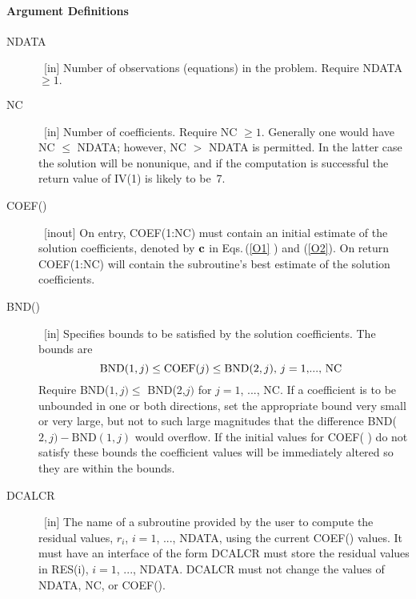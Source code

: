\documentclass[twoside]{MATH77}
\begin{document}
\paragraph{Argument Definitions}
\begin{description}
\item[NDATA]  \ [in] Number of observations (equations) in the problem.
Require NDATA $\geq 1.$

\item[NC]  \ [in] Number of coefficients. Require NC $\geq 1$. Generally one
would have NC $\leq $ NDATA; however, NC $>$ NDATA is permitted. In the
latter case the solution will be nonunique, and if the computation is
successful the return value of IV(1) is likely to be~7.

\item[COEF()]  \ [inout] On entry, COEF(1:NC) must contain an initial
estimate of the solution coefficients, denoted by ${\bf c}$ in Eqs.\,(\ref{O1}%
) and (\ref{O2}). On return COEF(1:NC) will contain the subroutine's best
estimate of the solution coefficients.

\item[BND()]  \ [in] Specifies bounds to be satisfied by the solution
coefficients. The bounds are
\begin{equation*}
\hspace{-5pt}\text{BND}(1,j)\leq \text{COEF}(j)\leq \text{BND}(2,j)
\text{, }j=1\text{,..., NC}
\end{equation*}
Require BND($1,j)\leq $ BND(2,$j)$ for $j=1$, ..., NC. If a coefficient is
to be unbounded in one or both directions, set the appropriate bound very
small or very large, but not to such large magnitudes that the
difference BND($2,j)-\text{BND}(1,j)$ would overflow. If the initial
values for COEF( ) do not satisfy these bounds the coefficient values will
be immediately altered so they are within the bounds.

\item[DCALCR]  \ [in] The name of a subroutine provided by the user to
compute the residual values, $r_i$, $i=1$, ..., NDATA, using the current
COEF() values. It must have an interface of the form
\vspace{-8pt}{\tt \begin{tabbing}
SUBROUTINE DCALCR(NDATA, NC, COEF, ICOUNT,\\
\ \ \ \=RES)\\
INTEGER NDATA, NC, ICOUNT\\
DOUBLE PRECISION COEF(NC), RES(NDATA)
\end{tabbing}}\vspace{-8pt}
DCALCR must store the residual values in RES(i), $i=1$, ..., NDATA. DCALCR
must not change the values of NDATA, NC, or COEF().


\end{description}
\end{document}
